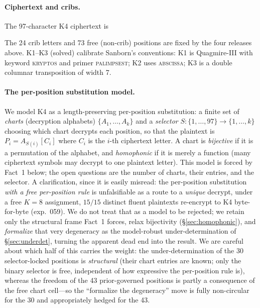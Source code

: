 \documentclass[11pt]{article}
\theoremstyle{plain}
\theoremstyle{definition}
\newcommand{\K}{\textsf{K4}}
\begin{document}
\paragraph{Ciphertext and cribs.}
The 97-character \K{} ciphertext is
\begin{center}\end{center}
The 24 crib letters and 73 free (non-crib) positions are fixed by the four releases
above. K1--K3 (solved) calibrate Sanborn's conventions: K1 is Quagmire-III with
keyword \textsc{kryptos} and primer \textsc{palimpsest}; K2 uses \textsc{abscissa};
K3 is a double columnar transposition of width 7.

\paragraph{The per-position substitution model.}
We model \K{} as a length-preserving per-position substitution: a finite set of
\emph{charts} (decryption alphabets) $\{A_1,\dots,A_k\}$ and a \emph{selector}
$S:\{1,\dots,97\}\to\{1,\dots,k\}$ choosing which chart decrypts each position, so
that the plaintext is $P_i = A_{S(i)}[C_i]$ where $C_i$ is the $i$-th ciphertext
letter. A chart is \emph{bijective} if it is a permutation of the alphabet, and
\emph{homophonic} if it is merely a function (many ciphertext symbols may decrypt to
one plaintext letter). This model is forced by Fact~1 below; the open questions are
the number of charts, their entries, and the selector. A clarification, since it is
easily misread: the per-position substitution \emph{with a free per-position rule} is
unfalsifiable as a route to a \emph{unique} decrypt, under a free $K{=}8$
assignment, $15/15$ distinct fluent plaintexts re-encrypt to \K{} byte-for-byte
(exp.~059). We do not treat that as a model to be rejected; we retain only the
structural frame Fact~1 forces, relax bijectivity (\S\ref{sec:homophonic}), and
\emph{formalize} that very degeneracy as the model-robust under-determination of
\S\ref{sec:underdet}, turning the apparent dead end into the result. We are careful
about which half of this carries the weight: the under-determination of the 30
selector-locked positions is \emph{structural} (their chart entries are known; only
the binary selector is free, independent of how expressive the per-position rule is),
whereas the freedom of the 43 prior-governed positions is partly a consequence of the
free chart cell---so the ``formalize the degeneracy'' move is fully non-circular for
the 30 and appropriately hedged for the 43.
\end{document}
